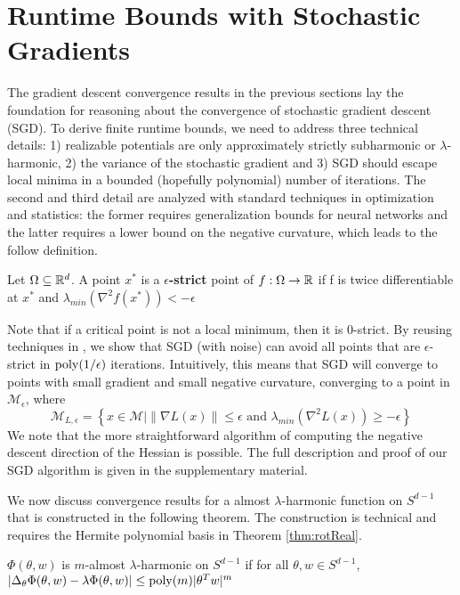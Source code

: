 
\section{Runtime Bounds with Stochastic Gradients}

The gradient descent convergence results in the previous sections lay
the foundation for reasoning about the convergence of stochastic
gradient descent (SGD). To derive finite runtime bounds, we need to
address three technical details: 1) realizable potentials are only
approximately strictly subharmonic or $\lambda$-harmonic, 2) the
variance of the stochastic gradient and 3) SGD should escape local
minima in a bounded (hopefully polynomial) number of iterations. The
second and third detail are analyzed with standard techniques in
optimization and statistics: the former requires generalization bounds
for neural networks and the latter requires a lower bound on the
negative curvature, which leads to the follow definition.
%
\begin{definition} 
Let $\Omega \subseteq {\mathbb{R}}^d$. A point $x^*$ is a
  {\bf $\epsilon$-strict} point of $f : \Omega \to {\mathbb{R}}$ if f is twice
  differentiable at $x^*$ and
  $\lambda_{min}(\nabla^2f(x^*)) < -\epsilon$
\end{definition}

Note that if a critical point is not a local minimum, then it is
$0$-strict. By reusing techniques in \cite{GeHJY15}, we show that SGD (with noise) can avoid all points that are $\epsilon$-strict in $\mathrm{poly}(1/\epsilon)$ iterations. Intuitively, this means that SGD will converge to points with small gradient and small negative curvature, converging to a point in $\mathcal{M}_\epsilon$, where 
%
\[\mathcal{M}_{L, \epsilon} = \left\{x\in \mathcal{M} \Big| \|\nabla L(x)\|
  \leq \epsilon \text{ and } \lambda_{min}(\nabla^2 L(x)) \geq
  -\epsilon\right\}\]
%
We note that the more straightforward algorithm of computing the negative descent direction of the Hessian is possible. The full description and proof of our SGD algorithm is given in the supplementary material. 

We now discuss convergence results for a almost $\lambda$-harmonic function on $S^{d-1}$ that is constructed in the following theorem. The construction is technical and requires the Hermite polynomial basis in Theorem \ref{thm:rotReal}.
%
\begin{definition}
$\Phi(\theta, w)$ is $m$-almost $\lambda$-harmonic on $S^{d-1}$ if for
all $\theta, w\in S^{d-1}$, $|\Delta_{\theta}\Phi(\theta, w) - \lambda \Phi (\theta,w)| \leq \mathrm{poly}(m)|\theta^Tw|^m$ 
\end{definition}


